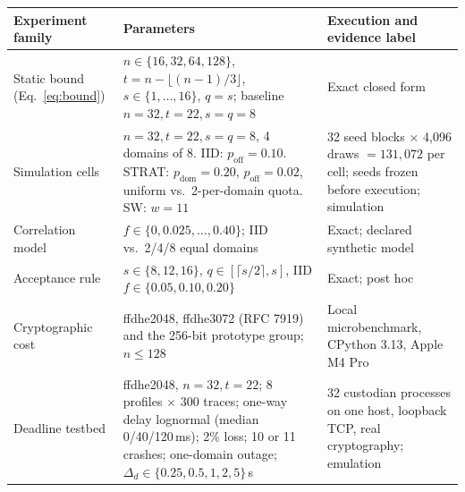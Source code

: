 \begin{tabularx}{\textwidth}{@{}>{\raggedright\arraybackslash}p{}>{\raggedright\arraybackslash}p{}X@{}}
\toprule
Experiment family & Parameters & Execution and evidence label\\
\midrule
Static bound (Eq.~\ref{eq:bound}) & $n\in\{16,32,64,128\}$, $t=n-\lfloor (n-1)/3\rfloor$, $s\in\{1,\dots,16\}$, $q=s$; baseline $n=32,t=22,s=q=8$ & Exact closed form\\
Simulation cells & $n=32,t=22,s=q=8$, 4 domains of 8. IID: $p_{\mathrm{off}}=0.10$. STRAT: $p_{\mathrm{dom}}=0.20$, $p_{\mathrm{off}}=0.02$, uniform vs.\ 2-per-domain quota. SW: $w=11$ & 32 seed blocks $\times$ 4{,}096 draws $=131{,}072$ per cell; seeds frozen before execution; simulation\\
Correlation model & $f\in\{0,0.025,\dots,0.40\}$; IID vs.\ 2/4/8 equal domains & Exact; declared synthetic model\\
Acceptance rule & $s\in\{8,12,16\}$, $q\in[\lceil s/2\rceil,s]$, IID $f\in\{0.05,0.10,0.20\}$ & Exact; post hoc\\
Cryptographic cost & ffdhe2048, ffdhe3072 (RFC 7919) and the 256-bit prototype group; $n\le 128$ & Local microbenchmark, CPython 3.13, Apple M4 Pro\\
Deadline testbed & ffdhe2048, $n=32,t=22$; 8 profiles $\times$ 300 traces; one-way delay lognormal (median 0/40/120\,ms); 2\% loss; 10 or 11 crashes; one-domain outage; $\Delta_d\in\{0.25,0.5,1,2,5\}$\,s & 32 custodian processes on one host, loopback TCP, real cryptography; emulation\\
\bottomrule
\end{tabularx}
